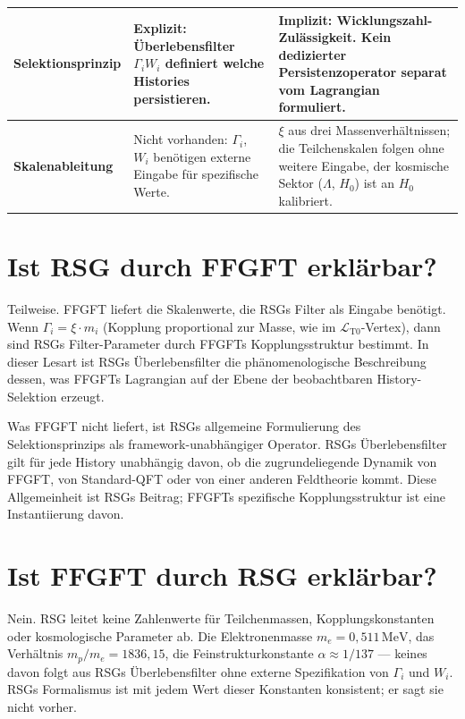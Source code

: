 {\begin{longtable}{p{3.5cm}p{5.0cm}p{5.0cm}}
\midrule

\textbf{Selektionsprinzip} &
Explizit: Überlebensfilter $\Gamma_i W_i$ definiert welche Histories
persistieren. &
Implizit: Wicklungszahl-Zulässigkeit. Kein dedizierter Persistenzoperator
separat vom Lagrangian formuliert. \\

\midrule

\textbf{Skalenableitung} &
Nicht vorhanden: $\Gamma_i$, $W_i$ benötigen externe Eingabe für
spezifische Werte. &
$\xi$ aus drei Massenverhältnissen; die Teilchenskalen folgen ohne
weitere Eingabe, der kosmische Sektor ($\Lambda$, $H_0$) ist an $H_0$
kalibriert. \\

\end{longtable}
}

\section{Ist RSG durch FFGFT erklärbar?}

Teilweise. FFGFT liefert die Skalenwerte, die RSGs Filter als Eingabe
benötigt. Wenn $\Gamma_i = \xi \cdot m_i$ (Kopplung proportional zur Masse,
wie im $\mathcal{L}_{\text{T0}}$-Vertex), dann sind RSGs Filter-Parameter
durch FFGFTs Kopplungsstruktur bestimmt. In dieser Lesart ist RSGs
Überlebensfilter die phänomenologische Beschreibung dessen, was FFGFTs
Lagrangian auf der Ebene der beobachtbaren History-Selektion erzeugt.

Was FFGFT nicht liefert, ist RSGs allgemeine Formulierung des
Selektionsprinzips als framework-unabhängiger Operator. RSGs Überlebensfilter
gilt für jede History unabhängig davon, ob die zugrundeliegende Dynamik
von FFGFT, von Standard-QFT oder von einer anderen Feldtheorie kommt.
Diese Allgemeinheit ist RSGs Beitrag; FFGFTs spezifische Kopplungsstruktur
ist eine Instantiierung davon.

\section{Ist FFGFT durch RSG erklärbar?}

Nein. RSG leitet keine Zahlenwerte für Teilchenmassen, Kopplungskonstanten
oder kosmologische Parameter ab. Die Elektronenmasse $m_e = 0{,}511\,\text{MeV}$,
das Verhältnis $m_p/m_e = 1836{,}15$, die Feinstrukturkonstante
$\alpha \approx 1/137$ — keines davon folgt aus RSGs Überlebensfilter
ohne externe Spezifikation von $\Gamma_i$ und $W_i$. RSGs Formalismus ist
mit jedem Wert dieser Konstanten konsistent; er sagt sie nicht vorher.


